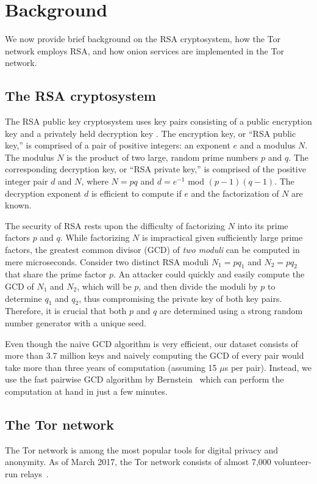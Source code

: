 \section{Background}
\label{sec:background}
We now provide brief background on the RSA cryptosystem, how the Tor
network employs RSA, and how onion services are implemented in the Tor network.

\subsection{The RSA cryptosystem}
The RSA public key cryptosystem uses key pairs consisting of a public encryption
key and a privately held decryption key \cite{rivest1978}. The encryption key,
or ``RSA public key,'' is comprised of a pair of positive integers: an exponent
$e$ and a modulus $N$. The modulus $N$ is the product of two large, random prime
numbers $p$ and $q$. The corresponding decryption key, or ``RSA private key,''
is comprised of the positive integer pair $d$ and $N$, where $N = pq$ and $d =
e^{-1}$ mod $(p - 1)(q - 1)$.  The decryption exponent $d$ is efficient to
compute if $e$ and the factorization of $N$ are known.

The security of RSA rests upon the difficulty of factorizing $N$ into its prime
factors $p$ and $q$.  While factorizing $N$ is impractical given sufficiently
large prime factors, the greatest common divisor (GCD) of \emph{two moduli} can
be computed in mere microseconds.  Consider two distinct RSA moduli $N_1 = pq_1$
and $N_2 = pq_2$ that share the prime factor $p$.  An attacker could quickly and
easily compute the GCD of $N_1$ and $N_2$, which will be $p$, and then divide the
moduli by $p$ to determine $q_1$ and $q_2$, thus compromising the private key of
both key pairs.  Therefore, it is crucial that both $p$ and $q$ are determined
using a strong random number generator with a unique seed.

Even though the naive GCD algorithm is very efficient, our dataset consists of
more than 3.7 million keys and naively computing the GCD of every pair would
take more than three years of computation (assuming 15 $\mu$s per pair).
Instead, we use the fast pairwise GCD algorithm by Bernstein~\cite{Bernstein04}
which can perform the computation at hand in just a few minutes.

\subsection{The Tor network}
\label{sec:tor-network}
The Tor network is among the most popular tools for digital privacy and
anonymity. As of March 2017, the Tor network consists of almost 7,000
volunteer-run relays~\cite{tormetrics}.

